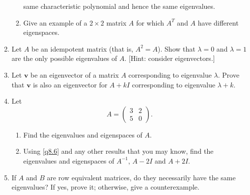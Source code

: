 \documentclass[english,12pt,a4paper]{scrartcl}
\renewcommand{\vec}[1]{\bm{#1}}
\begin{document}
\begin{enumerate}[start=6]
\begin{enumerate}
        same characteristic polynomial and hence the same eigenvalues.
      \item Give an example of a $2 \times 2$ matrix $A$ for which $A^T$ and 
        $A$ have different eigenspaces.
    \end{enumerate}
  \item %
    Let $A$ be an idempotent matrix (that is, $A^2 = A$). Show that $\lambda = 
    0$ and $\lambda = 1$ are the only possible eigenvalues of $A$. [Hint: 
    consider eigenvectors.]
  \item \label{q8.6} %
    Let $\vec{v}$ be an eigenvector of a matrix $A$ corresponding to eigenvalue 
    $\lambda$. Prove that $\vec{v}$ is also an eigenvector for $A + kI$ 
    corresponding to eigenvalue $\lambda + k$.
  \item %
    Let
    \[
      A =
      \begin{pmatrix}
        3 & 2 \\
        5 & 0
      \end{pmatrix}.
    \]
    \begin{enumerate}
      \item Find the eigenvalues and eigenspaces of $A$.
      \item Using \ref{q8.6} and any other results that you may know, find the 
        eigenvalues and eigenspaces of $A^{-1}$, $A - 2I$ and $A + 2I$.
    \end{enumerate}
  \item %
    If $A$ and $B$ are row equivalent matrices, do they necessarily have the 
    same eigenvalues? If yes, prove it; otherwise, give a counterexample.
\end{enumerate}
\end{document}
